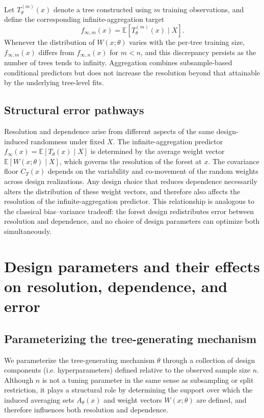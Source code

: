 \documentclass[11pt]{article}
\theoremstyle{plain}
\theoremstyle{definition}
\theoremstyle{remark}
\begin{document}
Let $T_\theta^{(m)}(x)$ denote a tree constructed using $m$ training observations, and define the corresponding infinite-aggregation target
\[
f_{\infty,m}(x)
=
\mathbb E\!\left[T_\theta^{(m)}(x)\mid X\right].
\]
Whenever the distribution of $W(x;\theta)$ varies with the per-tree training size, $f_{\infty,m}(x)$ differs from $f_{\infty,n}(x)$ for $m<n$, and this discrepancy persists as the number of trees tends to infinity. Aggregation combines subsample-based conditional predictors but does not increase the resolution beyond that attainable by the underlying tree-level fits.

\subsection{Structural error pathways}
\label{subsec:struc_errors}

Resolution and dependence arise from different aspects of the same design-induced randomness under fixed $X$. The infinite-aggregation predictor $f_\infty(x)=\mathbb E[T_\theta(x)\mid X]$ is determined by the average weight vector $\mathbb{E}[W(x;\theta)\mid X]$, which governs the resolution of the forest at $x$. The covariance floor $C_T(x)$ depends on the variability and co-movement of the random weights across design realizations. Any design choice that reduces dependence necessarily alters the distribution of these weight vectors, and therefore also affects the resolution of the infinite-aggregation predictor. This relationship is analogous to the classical bias--variance tradeoff: the forest design redistributes error between resolution and dependence, and no choice of design parameters can optimize both simultaneously.

\section{Design parameters and their effects on resolution, dependence, and error}
\label{sec:design_parameters}

\subsection{Parameterizing the tree-generating mechanism}
\label{subsec:design_parameterization}

We parameterize the tree-generating mechanism $\theta$ through a collection of design components (i.e. hyperparameters) defined relative to the observed sample size $n$. Although $n$ is not a tuning parameter in the same sense as subsampling or split restriction, it plays a structural role by determining the support over which the induced averaging sets $A_\theta(x)$ and weight vectors $W(x;\theta)$ are defined, and therefore influences both resolution and dependence.
\end{document}
